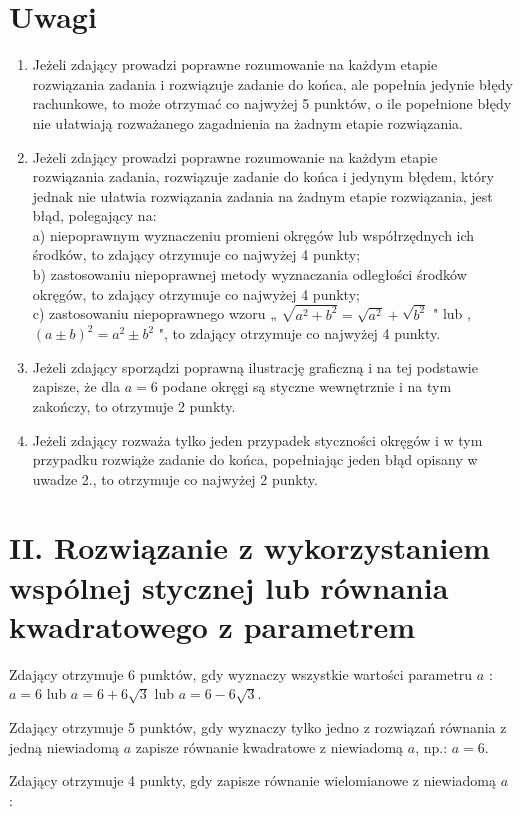 \documentclass[10pt]{article}
\begin{document}
\section*{Uwagi}
\begin{enumerate}
  \item Jeżeli zdający prowadzi poprawne rozumowanie na każdym etapie rozwiązania zadania i rozwiązuje zadanie do końca, ale popełnia jedynie błędy rachunkowe, to może otrzymać co najwyżej 5 punktów, o ile popełnione błędy nie ułatwiają rozważanego zagadnienia na żadnym etapie rozwiązania.
  \item Jeżeli zdający prowadzi poprawne rozumowanie na każdym etapie rozwiązania zadania, rozwiązuje zadanie do końca i jedynym błędem, który jednak nie ułatwia rozwiązania zadania na żadnym etapie rozwiązania, jest błąd, polegający na:\\
a) niepoprawnym wyznaczeniu promieni okręgów lub współrzędnych ich środków, to zdający otrzymuje co najwyżej 4 punkty;\\
b) zastosowaniu niepoprawnej metody wyznaczania odległości środków okręgów, to zdający otrzymuje co najwyżej 4 punkty;\\
c) zastosowaniu niepoprawnego wzoru „ $\sqrt{a^{2}+b^{2}}=\sqrt{a^{2}}+\sqrt{b^{2}}$ " lub , $(a \pm b)^{2}=a^{2} \pm b^{2}$ ", to zdający otrzymuje co najwyżej 4 punkty.
  \item Jeżeli zdający sporządzi poprawną ilustrację graficzną i na tej podstawie zapisze, że dla $a=6$ podane okręgi są styczne wewnętrznie i na tym zakończy, to otrzymuje 2 punkty.
  \item Jeżeli zdający rozważa tylko jeden przypadek styczności okręgów i w tym przypadku rozwiąże zadanie do końca, popełniając jeden błąd opisany w uwadze 2., to otrzymuje co najwyżej 2 punkty.
\end{enumerate}

\section*{II. Rozwiązanie z wykorzystaniem wspólnej stycznej lub równania kwadratowego z parametrem}
Zdający otrzymuje 6 punktów, gdy wyznaczy wszystkie wartości parametru $a$ : $a=6$ lub $a=6+6 \sqrt{3}$ lub $a=6-6 \sqrt{3}$.

Zdający otrzymuje 5 punktów, gdy wyznaczy tylko jedno z rozwiązań równania z jedną niewiadomą $a$ zapisze równanie kwadratowe z niewiadomą $a$, np.: $a=6$.

Zdający otrzymuje 4 punkty, gdy zapisze równanie wielomianowe z niewiadomą $a$ :
\end{document}
